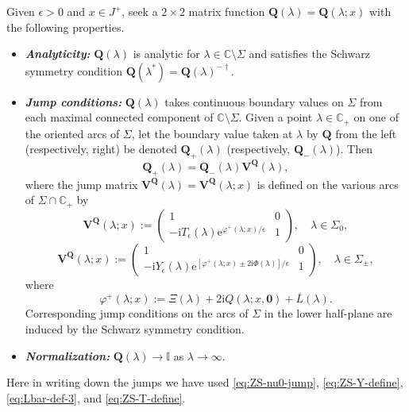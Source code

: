 \documentclass[12pt]{amsart}
\numberwithin{equation}{section}
\newcommand{\ee}{\mathrm{e}}
\newcommand{\ii}{\mathrm{i}}
\newcommand{\SP}{\lambda}
\newcommand{\phaseint}{\Phi}
\newcommand{\tailint}{\Xi}
\def\eq{\begin{equation}}
\def\endeq{\end{equation}}
\begin{document}
\begin{myrhp}
Given $\epsilon>0$ and $x \in J^+$, seek a $2\times 2$ matrix function $\mathbf{Q}(\SP)=\mathbf{Q}(\SP;x)$ with the following properties.
\begin{itemize}
\item[]\textit{\textbf{Analyticity:}}  $\mathbf{Q}(\SP)$ is analytic for $\SP\in\mathbb{C}\setminus\Sigma$ and satisfies the Schwarz symmetry condition $\mathbf{Q}(\SP^*)=\mathbf{Q}(\SP)^{-\dagger}$.
\item[]\textit{\textbf{Jump conditions:}} $\mathbf{Q}(\SP)$ takes continuous boundary values on $\Sigma$ from each maximal connected component of $\mathbb{C}\setminus\Sigma$.  Given a point $\SP\in\mathbb{C}_+$ on one of the oriented arcs of $\Sigma$, let the boundary value taken at $\SP$ by $\mathbf{Q}$ from the left (respectively, right) be denoted $\mathbf{Q}_+(\SP)$ (respectively, $\mathbf{Q}_-(\SP)$).  Then 
\begin{equation}
\mathbf{Q}_+(\SP)=\mathbf{Q}_-(\SP)\mathbf{V^Q}(\SP),
\end{equation}
where the jump matrix $\mathbf{V^Q}(\SP)=\mathbf{V^Q}(\SP;x)$ is defined on the various arcs of $\Sigma\cap\mathbb{C}_+$ by 
\begin{equation}
\mathbf{V^Q}(\SP;x):=\begin{pmatrix} 1 & 0 \\ -\ii T_\epsilon(\SP) \ee^{\varphi^+(\SP;x)/\epsilon} & 1 \end{pmatrix}
,\quad \SP\in\Sigma_0,
\label{eq:jump+++1}
\end{equation}
\eq
\mathbf{V^Q}(\SP;x):= \begin{pmatrix} 1 & 0 \\ -\ii Y_\epsilon(\SP)\ee^{[\varphi^+(\SP;x)\pm 2\ii\phaseint(\SP)]/\epsilon} & 1 \end{pmatrix}, \quad \SP\in\Sigma_\pm,
\label{eq:jump+++2}
\endeq
where 
\eq
\label{eq:varphi+}
\varphi^+(\lambda;x):=\tailint(\lambda)+2\ii Q(\lambda;x,\mathbf{0})+\overline{L}(\lambda).
\endeq
Corresponding jump conditions on the arcs of $\Sigma$ in the lower half-plane are induced by the Schwarz symmetry condition.
\item[]\textit{\textbf{Normalization:}} $\mathbf{Q}(\SP)\to\mathbb{I}$ as $\SP\to\infty$.
\end{itemize}
\label{rhp:+++}
\end{myrhp}
Here in writing down the jumps we have used \eqref{eq:ZS-nu0-jump}, \eqref{eq:ZS-Y-define}, 
\eqref{eq:Lbar-def-3}, and \eqref{eq:ZS-T-define}.
\end{document}
